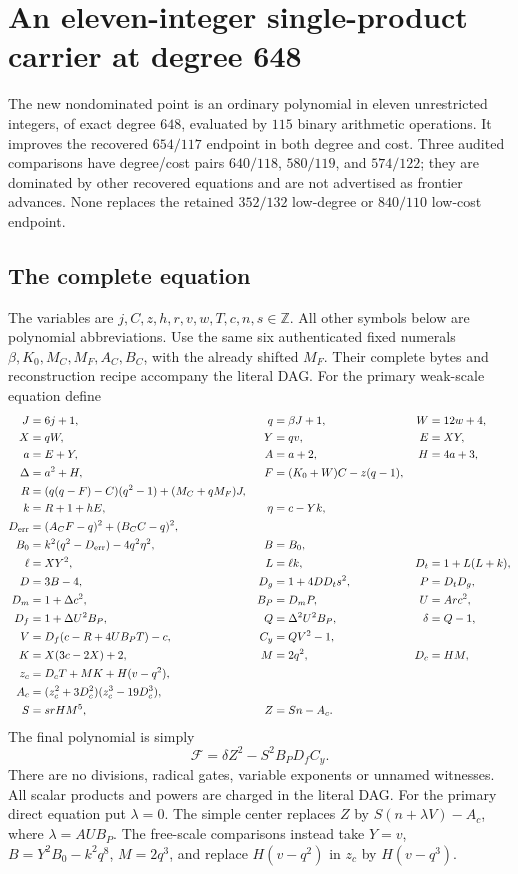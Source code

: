 \documentclass[11pt]{article}
\begin{document}
\section[Eleven integers with an amplified product carrier]{An eleven-integer single-product carrier at degree 648}
\label{sec:integer-product}
The new nondominated point is an ordinary polynomial in eleven unrestricted
integers, of exact degree \(648\), evaluated by \(115\) binary arithmetic
operations. It improves the recovered \(654/117\) endpoint in both degree and
cost. Three audited comparisons have degree/cost pairs \(640/118\),
\(580/119\), and \(574/122\); they are dominated by other recovered equations
and are not advertised as frontier advances. None replaces the retained
\(352/132\) low-degree or \(840/110\) low-cost endpoint.

\subsection{The complete equation}
The variables are \(j,C,z,h,r,v,w,T,c,n,s\in\mathbb Z\). All other symbols
below are polynomial abbreviations. Use the same six authenticated fixed
numerals \(\beta,K_0,M_C,M_F,A_C,B_C\), with the already shifted \(M_F\).
Their complete bytes and reconstruction recipe accompany the literal DAG.
For the primary weak-scale equation define
\begin{align*}
 J&=6j+1,&q&=\beta J+1,&W&=12w+4,\\
 X&=qW,&Y&=qv,&E&=XY,\\
 a&=E+Y,&A&=a+2,&H&=4a+3,\\
 \Delta&=a^2+H,&F&=(K_0+W)C-z(q-1),\\
 R&=(q(q-F)-C)(q^2-1)+(M_C+qM_F)J,\\
 k&=R+1+hE,&\eta&=c-Yk,\\
 D_{\rm err}&=(A_CF-q)^2+(B_CC-q)^2,\\
 B_0&=k^2(q^2-D_{\rm err})-4q^2\eta^2,&B&=B_0,\\
 \ell&=XY^2,&L&=\ell k,&D_t&=1+L(L+k),\\
 D&=3B-4,&D_g&=1+4DD_ts^2,&P&=D_tD_g,\\
 D_m&=1+\Delta c^2,&B_P&=D_mP,&U&=Arc^2,\\
 D_f&=1+\Delta U^2B_P,&Q&=\Delta^2U^2B_P,&\delta&=Q-1,\\
 V&=D_f(c-R+4UB_PT)-c,&C_y&=QV^2-1,\\
 K&=X(3c-2X)+2,&M&=2q^2,&D_c&=HM,\\
 z_c&=D_cT+MK+H(v-q^2),\\
 A_c&=(z_c^2+3D_c^2)(z_c^3-19D_c^3),\\
 S&=srHM^5,&Z&=Sn-A_c.
\end{align*}
The final polynomial is simply
\[
 \boxed{\mathcal F=\delta Z^2-S^2B_PD_fC_y.}
\]
There are no divisions, radical gates, variable exponents or unnamed
witnesses. All scalar products and powers are charged in the literal DAG.
For the primary direct equation put $\lambda=0$. The simple center replaces \(Z\) by \(S(n+\lambda V)-A_c\), where
\(\lambda=AUB_P\). The free-scale comparisons instead take
\(Y=v\), \(B=Y^2B_0-k^2q^8\), \(M=2q^3\), and replace
\(H(v-q^2)\) in \(z_c\) by \(H(v-q^3)\).
\end{document}
